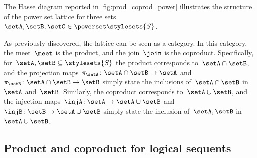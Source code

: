 The Hasse diagram reported in \cref{fig:prod_coprod_power} illustrates the structure of the power set lattice for three sets~$\setA,\setB,\setC\in \powerset \stylesets{S}$.


As previously discovered, the lattice can be seen as a category.
In this category, the meet~$\meet$ is the product, and the join~$\join$ is the coproduct.
Specifically, for~$\setA,\setB\subseteq \stylesets{S}$ the product corresponds to~$\setA\cap \setB$, and the projection maps~$\pi_\setA\colon \setA\cap \setB\to \setA$ and~$\pi_\setB\colon \setA\cap \setB\to \setB$ simply state the inclusions of~$\setA\cap \setB$ in~$\setA$ and~$\setB$.
Similarly, the coproduct corresponds to~$\setA\cup \setB$, and the injection maps~$\injA\colon \setA\to \setA\cup \setB$ and~$\injB\colon \setB\to \setA\cup \setB$ simply state the inclusion of~$\setA,\setB$ in~$\setA\cup \setB$.

\subsection{Product and coproduct for logical sequents}
\publictodomessage

